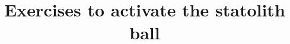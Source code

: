 
\graphicspath{{../../../images/Exercises/}} %


\title{Exercises to activate the statolith ball} %



\begin{frame}
\titlepage %
\end{frame}



 